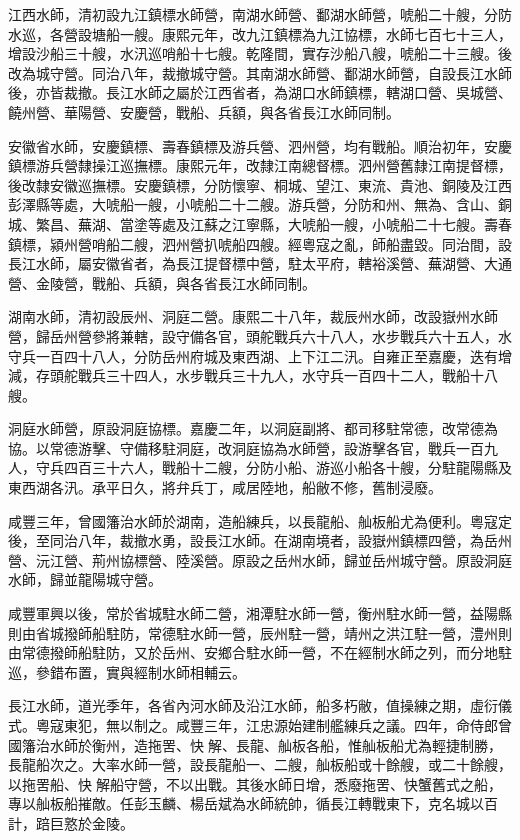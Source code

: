 \begin{pinyinscope}
江西水師，清初設九江鎮標水師營，南湖水師營、鄱湖水師營，唬船二十艘，分防水巡，各營設塘船一艘。康熙元年，改九江鎮標為九江協標，水師七百七十三人，增設沙船三十艘，水汛巡哨船十七艘。乾隆間，實存沙船八艘，唬船二十三艘。後改為城守營。同治八年，裁撤城守營。其南湖水師營、鄱湖水師營，自設長江水師後，亦皆裁撤。長江水師之屬於江西省者，為湖口水師鎮標，轄湖口營、吳城營、饒州營、華陽營、安慶營，戰船、兵額，與各省長江水師同制。

安徽省水師，安慶鎮標、壽春鎮標及游兵營、泗州營，均有戰船。順治初年，安慶鎮標游兵營隸操江巡撫標。康熙元年，改隸江南總督標。泗州營舊隸江南提督標，後改隸安徽巡撫標。安慶鎮標，分防懷寧、桐城、望江、東流、貴池、銅陵及江西彭澤縣等處，大唬船一艘，小唬船二十二艘。游兵營，分防和州、無為、含山、銅城、繁昌、蕪湖、當塗等處及江蘇之江寧縣，大唬船一艘，小唬船二十七艘。壽春鎮標，潁州營哨船二艘，泗州營扒唬船四艘。經粵寇之亂，師船盡毀。同治間，設長江水師，屬安徽省者，為長江提督標中營，駐太平府，轄裕溪營、蕪湖營、大通營、金陵營，戰船、兵額，與各省長江水師同制。

湖南水師，清初設辰州、洞庭二營。康熙二十八年，裁辰州水師，改設嶽州水師營，歸岳州營參將兼轄，設守備各官，頭舵戰兵六十八人，水步戰兵六十五人，水守兵一百四十八人，分防岳州府城及東西湖、上下江二汛。自雍正至嘉慶，迭有增減，存頭舵戰兵三十四人，水步戰兵三十九人，水守兵一百四十二人，戰船十八艘。

洞庭水師營，原設洞庭協標。嘉慶二年，以洞庭副將、都司移駐常德，改常德為協。以常德游擊、守備移駐洞庭，改洞庭協為水師營，設游擊各官，戰兵一百九人，守兵四百三十六人，戰船十二艘，分防小船、游巡小船各十艘，分駐龍陽縣及東西湖各汛。承平日久，將弁兵丁，咸居陸地，船敝不修，舊制浸廢。

咸豐三年，曾國籓治水師於湖南，造船練兵，以長龍船、舢板船尤為便利。粵寇定後，至同治八年，裁撤水勇，設長江水師。在湖南境者，設嶽州鎮標四營，為岳州營、沅江營、荊州協標營、陸溪營。原設之岳州水師，歸並岳州城守營。原設洞庭水師，歸並龍陽城守營。

咸豐軍興以後，常於省城駐水師二營，湘潭駐水師一營，衡州駐水師一營，益陽縣則由省城撥師船駐防，常德駐水師一營，辰州駐一營，靖州之洪江駐一營，澧州則由常德撥師船駐防，又於岳州、安鄉合駐水師一營，不在經制水師之列，而分地駐巡，參錯布置，實與經制水師相輔云。

長江水師，道光季年，各省內河水師及沿江水師，船多朽敝，值操練之期，虛衍儀式。粵寇東犯，無以制之。咸豐三年，江忠源始建制艦練兵之議。四年，命侍郎曾國籓治水師於衡州，造拖罟、快解、長龍、舢板各船，惟舢板船尤為輕捷制勝，長龍船次之。大率水師一營，設長龍船一、二艘，舢板船或十餘艘，或二十餘艘，以拖罟船、快解船守營，不以出戰。其後水師日增，悉廢拖罟、快蟹舊式之船，專以舢板船摧敵。任彭玉麟、楊岳斌為水師統帥，循長江轉戰東下，克名城以百計，踣巨憝於金陵。


\end{pinyinscope}

